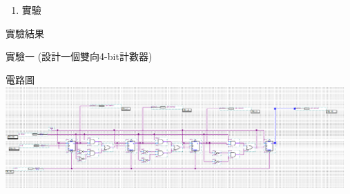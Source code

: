 \documentclass[12pt, a4paper]{article}
\begin{document}
\begin{description}
\begin{enumerate}
          \item 實驗 
        \normalsize
      \end{enumerate}

    \item [二、]實驗結果
      \begin{description}
        \fontsize{20pt}{22pt}\selectfont
        \item 實驗一 (設計一個雙向4-bit計數器)
            \begin{description}
              \fontsize{18pt}{20pt}
                \item []電路圖 \\[.3cm]
                  \includegraphics[width=13cm]{./image/ex1.png}
            \end{description}
          \normalsize
          

\end{description}
\end{description}
\end{document}
